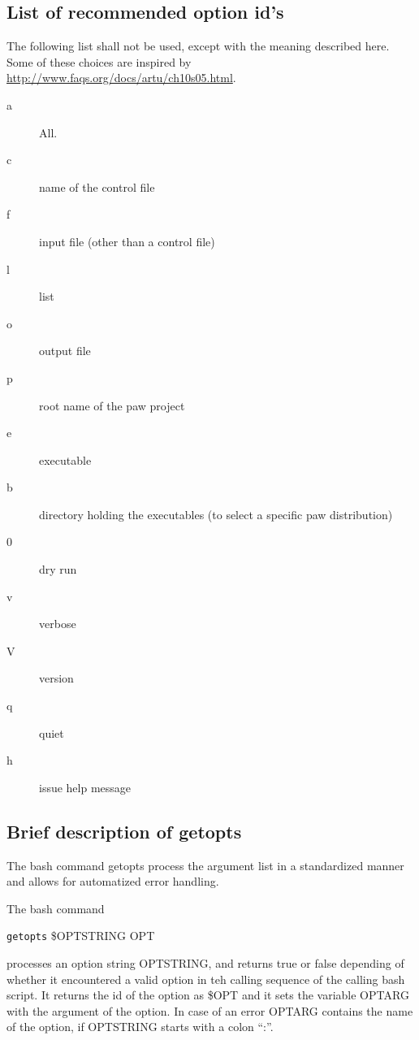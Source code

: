 \documentclass[11pt,a4paper]{report}
\begin{document}
\subsection{List of recommended option id's}
The following list shall not be used, except with the meaning
described here. Some of these choices are inspired by
\url{http://www.faqs.org/docs/artu/ch10s05.html}.
\begin{description}
\item[a] All.
\item[c] name of the control file
\item[f] input file (other than a control file)
\item[l] list
\item[o] output file
\item[p] root name of the paw project 
\item[e] executable
\item[b] directory holding the executables (to select a specific paw
  distribution)
\item[0] dry run
\item[v] verbose
\item[V] version
\item[q] quiet
\item[h] issue help message
\end{description}

\subsection{Brief description of getopts}
The bash command getopts process the argument list in a standardized
manner and allows for automatized error handling.

The bash command 
\begin{center}
\verb|getopts| \$OPTSTRING OPT
\end{center}
processes an option string OPTSTRING, and returns true or false
depending of whether it encountered a valid option in teh calling
sequence of the calling bash script. It returns the id of the option
as \$OPT and it sets the variable OPTARG with the argument of the
option. In case of an error OPTARG contains the name of the option, if
OPTSTRING starts with a colon ``:''.
\end{document}
